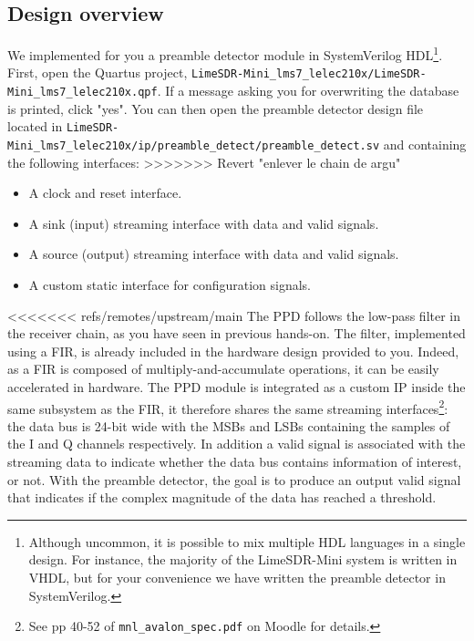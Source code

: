 \subsection{Design overview}
We implemented for you a preamble detector module in SystemVerilog HDL\footnote{Although uncommon, it is possible to mix multiple HDL languages in a single design. For instance, the majority of the LimeSDR-Mini system is written in VHDL, but for your convenience we have written the preamble detector in SystemVerilog.}. First, open the Quartus project, \texttt{LimeSDR-Mini\_lms7\_lelec210x/LimeSDR-Mini\_lms7\_lelec210x.qpf}. If a message asking you for overwriting the database is printed, click "yes". You can then open the preamble detector design file located in \texttt{LimeSDR-Mini\_lms7\_lelec210x/ip/preamble\_detect/preamble\_detect.sv} and containing the following interfaces:
>>>>>>> Revert "enlever le chain de argu"
\begin{itemize}
    \item A clock and reset interface.
    \item A sink (input) streaming interface with data and valid signals.
    \item A source (output) streaming interface with data and valid signals.
    \item A custom static interface for configuration signals.
\end{itemize}
<<<<<<< refs/remotes/upstream/main
The PPD follows the low-pass filter in the receiver chain, as you have seen in previous hands-on. The filter, implemented using a FIR, is already included in the hardware design provided to you. Indeed, as a FIR is composed of multiply-and-accumulate operations, it can be easily accelerated in hardware. The  PPD module is integrated as a custom IP inside the same subsystem as the FIR, it therefore shares the same streaming interfaces\footnote{See pp 40-52 of \texttt{mnl\_avalon\_spec.pdf} on Moodle for details.}: the data bus is 24-bit wide with the MSBs and LSBs containing the samples of the I and Q channels respectively. In addition a valid signal is associated with the streaming data to indicate whether the data bus contains information of interest, or not. With the preamble detector, the goal is to produce an output valid signal that indicates if the complex magnitude of the data has reached a threshold.

